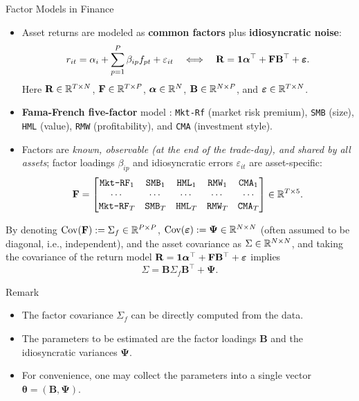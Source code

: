 \documentclass[10pt,aspectratio=169]{beamer}
\newcommand{\Param}{\theta}
\newcommand{\SigmaMat}{\Sigma}
\begin{document}
\begin{frame}[allowframebreaks]{Factor Models in Finance}
\footnotesize

  \begin{itemize}
    \item Asset returns are modeled as \textbf{common factors} plus \textbf{idiosyncratic noise}:
      \[
        r_{it} = \alpha_i + \sum_{p=1}^P \beta_{ip} f_{pt} + \varepsilon_{it}
        \quad\Longleftrightarrow\quad
        \mathbf{R} = \mathbf{1} \boldsymbol{\alpha}^\top + \mathbf{F}\mathbf{B}^\top + \boldsymbol{\varepsilon}.
      \]
      Here $\mathbf{R}\in\mathbb{R}^{T\times N}$, $\mathbf{F}\in\mathbb{R}^{T\times P}$, $\boldsymbol{\alpha}\in\mathbb{R}^N$, $\mathbf{B}\in\mathbb{R}^{N\times P}$, and $\boldsymbol{\varepsilon}\in\mathbb{R}^{T\times N}$.

    \item \textbf{Fama-French five-factor} model \parencite{FamaFrench2015FiveFactor}: \texttt{Mkt-Rf} (market risk premium), \texttt{SMB} (size), \texttt{HML} (value), \texttt{RMW} (profitability), and \texttt{CMA} (investment style).

    \item Factors are \emph{known, observable (at the end of the trade-day), and shared by all assets}; factor loadings $\beta_{ip}$ and idiosyncratic errors $\varepsilon_{it}$ are asset-specific:
      {
      \[
        \mathbf{F} =
        \begin{bmatrix}
          \texttt{Mkt-RF}_1 & \texttt{SMB}_1 & \texttt{HML}_1 & \texttt{RMW}_1 & \texttt{CMA}_1 \\
          \cdots & \cdots & \cdots & \cdots & \cdots \\
          \texttt{Mkt-RF}_T & \texttt{SMB}_T & \texttt{HML}_T & \texttt{RMW}_T & \texttt{CMA}_T
        \end{bmatrix}
        \in \mathbb{R}^{T\times 5}.
      \] 
      }
      \end{itemize}
  \framebreak
    By denoting $\operatorname{Cov}(\mathbf{F}) := \SigmaMat_f \in \RR^{P\times P}$, $\operatorname{Cov}(\boldsymbol{\varepsilon}) := \boldsymbol{\Psi} \in \mathbb{R}^{N\times N}$ (often assumed to be diagonal, i.e., independent), and the asset covariance as $\SigmaMat \in \RR^{N\times N}$, and taking the covariance of the return model $\mathbf{R} = \mathbf{1} \boldsymbol{\alpha}^\top + \mathbf{F}\mathbf{B}^\top + \boldsymbol{\varepsilon}$ implies
    \[
      \SigmaMat = \mathbf{B} \SigmaMat_f \mathbf{B}^\top + \boldsymbol{\Psi}.
    \]
    \begin{block}{\footnotesize Remark}
          \begin{itemize}
            \footnotesize
          \item The factor covariance $\SigmaMat_f$ can be directly computed from the data.
          \item The parameters to be estimated are the factor loadings $\mathbf{B}$ and the idiosyncratic variances $\boldsymbol{\Psi}$.
          \item For convenience, one may collect the parameters into a single vector $\boldsymbol{\Param} = (\mathbf{B}, \boldsymbol{\Psi})$.
        \end{itemize}
    \end{block}
\end{frame}
\end{document}
